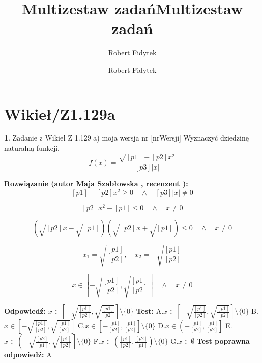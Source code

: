 \documentclass[12pt, a4paper]{article}
\title{Multizestaw zadań}
\author{Robert Fidytek}
\date{}\documentclass[12pt, a4paper]{article}
\title{Multizestaw zadań}
\author{Robert Fidytek}
\date{}
\theoremstyle{definition} %
\newtheorem{zad}{}
\theoremstyle{definition} %
\newtheorem{zad}{}
\newcommand{\kategoria}[1]{\section{#1}} %
\newcommand{\zadStart}[1]{\begin{zad}#1\newline} %
\newcommand{\zadStop}{\end{zad}}   %
\newcommand{\rozwStart}[2]{\noindent \textbf{Rozwiązanie (autor #1 , recenzent #2): }\newline} %
\newcommand{\rozwStop}{\newline}                                            %
\newcommand{\odpStart}{\noindent \textbf{Odpowiedź:}\newline}    %
\newcommand{\odpStop}{\newline}                                             %
\newcommand{\testStart}{\noindent \textbf{Test:}\newline} %
\newcommand{\testStop}{\newline} %
\newcommand{\kluczStart}{\noindent \textbf{Test poprawna odpowiedź:}\newline} %
\newcommand{\kluczStop}{\newline} %
\begin{document}
\maketitle


\kategoria{Wikieł/Z1.129a}
\zadStart{Zadanie z Wikieł Z 1.129 a) moja wersja nr [nrWersji]}
Wyznaczyć dziedzinę naturalną funkcji.
$$f(x)=\frac{\sqrt{[p1]-[p2]x^{2}}}{[p3]|x|}$$
\zadStop

\rozwStart{Maja Szabłowska}{}
$$[p1]-[p2]x^{2}\geq 0 \quad \land \quad [p3]|x|\neq0$$

$$[p2]x^{2}-[p1]\leq 0 \quad \land \quad x\neq0$$

$$(\sqrt{[p2]}x-\sqrt{[p1]})(\sqrt{[p2]}x+\sqrt{[p1]})\leq 0 \quad \land \quad x\neq0$$

$$x_{1}=\sqrt{\frac{[p1]}{[p2]}},\quad x_{2}=-\sqrt{\frac{[p1]}{[p2]}}$$

$$x\in\left[-\sqrt{\frac{[p1]}{[p2]}},\sqrt{\frac{[p1]}{[p2]}} \right]\quad \land \quad x\neq0$$

\rozwStop
\odpStart
$x\in\left[-\sqrt{\frac{[p1]}{[p2]}},\sqrt{\frac{[p1]}{[p2]}} \right]\setminus\{0\}$
\odpStop
\testStart
A.$x\in\left[-\sqrt{\frac{[p1]}{[p2]}},\sqrt{\frac{[p1]}{[p2]}} \right]\setminus\{0\}$
B.$x\in\left[-\sqrt{\frac{[p1]}{[p2]}},\sqrt{\frac{[p1]}{[p2]}} \right]$
C.$x\in\left[-\frac{[p1]}{[p2]},\frac{[p1]}{[p2]} \right]\setminus\{0\}$
D.$x\in\left(-\frac{[p1]}{[p2]},\frac{[p1]}{[p2]} \right]$
E.$x\in\left(-\sqrt{\frac{[p2]}{[p1]}},\sqrt{\frac{[p1]}{[p2]}} \right]\setminus\{0\}$
F.$x\in\left(\frac{[p1]}{[p2]},\frac{[p2]}{[p1]} \right)\setminus\{0\}$
G.$x\in\emptyset$
\testStop
\kluczStart
A
\kluczStop
\end{document}
